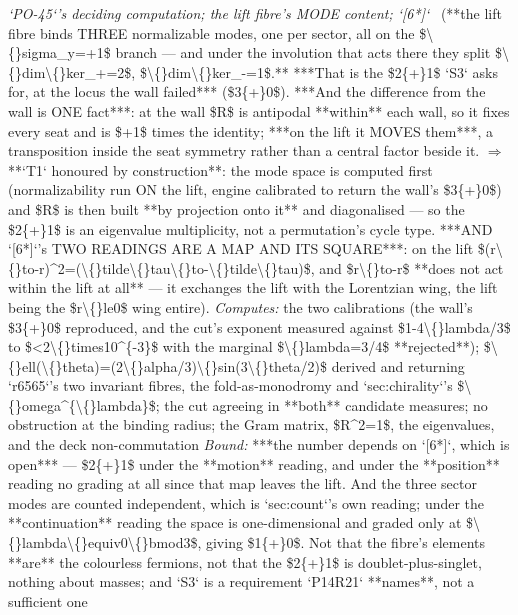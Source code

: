 \begin{description}
\textit{`PO-45`'s deciding computation; the lift fibre's MODE content; `[6*]`} \ (**the lift fibre binds THREE normalizable modes, one per sector, all on the \$\textbackslash\{\}sigma\_y=+1\$ branch --- and under the involution that acts there they split \$\textbackslash\{\}dim\textbackslash\{\}ker\_+=2\$, \$\textbackslash\{\}dim\textbackslash\{\}ker\_-=1\$.** ***That is the \$2\{+\}1\$ `S3` asks for, at the locus the wall failed*** (\$3\{+\}0\$).  ***And the difference from the wall is ONE fact***: at the wall \$R\$ is antipodal **within** each wall, so it fixes every seat and is \$+1\$ times the identity; ***on the lift it MOVES them***, a transposition inside the seat symmetry rather than a central factor beside it. \ensuremath{\Rightarrow} **`T1` honoured by construction**: the mode space is computed first (normalizability run ON the lift, engine calibrated to return the wall's \$3\{+\}0\$) and \$R\$ is then built **by projection onto it** and diagonalised --- so the \$2\{+\}1\$ is an eigenvalue multiplicity, not a permutation's cycle type.  ***AND `[6*]`'s TWO READINGS ARE A MAP AND ITS SQUARE***: on the lift \$(r\textbackslash\{\}to-r)\textasciicircum{}2=(\textbackslash\{\}tilde\textbackslash\{\}tau\textbackslash\{\}to-\textbackslash\{\}tilde\textbackslash\{\}tau)\$, and \$r\textbackslash\{\}to-r\$ **does not act within the lift at all** --- it exchanges the lift with the Lorentzian wing, the lift being the \$r\textbackslash\{\}le0\$ wing entire). 
\emph{Computes:} the two calibrations (the wall's \$3\{+\}0\$ reproduced, and the cut's exponent measured against \$1-4\textbackslash\{\}lambda/3\$ to \$<2\textbackslash\{\}times10\textasciicircum{}\{-3\}\$ with the marginal \$\textbackslash\{\}lambda=3/4\$ **rejected**); \$\textbackslash\{\}ell(\textbackslash\{\}theta)=(2\textbackslash\{\}alpha/3)\textbackslash\{\}sin(3\textbackslash\{\}theta/2)\$ derived and returning `r6565`'s two invariant fibres, the fold-as-monodromy and `sec:chirality`'s \$\textbackslash\{\}omega\textasciicircum{}\{\textbackslash\{\}lambda\}\$; the cut agreeing in **both** candidate measures; no obstruction at the binding radius; the Gram matrix, \$R\textasciicircum{}2=1\$, the eigenvalues, and the deck non-commutation
 \emph{Bound:}  ***the number depends on `[6*]`, which is open*** --- \$2\{+\}1\$ under the **motion** reading, and under the **position** reading no grading at all since that map leaves the lift. And the three sector modes are counted independent, which is `sec:count`'s own reading; under the **continuation** reading the space is one-dimensional and graded only at \$\textbackslash\{\}lambda\textbackslash\{\}equiv0\textbackslash\{\}bmod3\$, giving \$1\{+\}0\$.  Not that the fibre's elements **are** the colourless fermions, not that the \$2\{+\}1\$ is doublet-plus-singlet, nothing about masses; and `S3` is a requirement `P14R21` **names**, not a sufficient one

\end{description}
